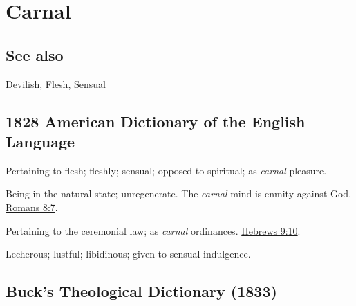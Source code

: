 \section{Carnal}
	\label{CARNAL}
	
\subsection{See also}

	\hyperref[DEVILISH]{Devilish}, \hyperref[FLESH]{Flesh}, \hyperref[SENSUAL]{Sensual}

\subsection{1828 American Dictionary of the English Language} %
	\label{CARNAL-1828}

	\begin{compactitem}
		\item[1] Pertaining to flesh; fleshly; sensual; opposed to spiritual; as \textit{carnal} pleasure.
		\item[2] Being in the natural state; unregenerate. The \textit{carnal} mind is enmity against God. \hyperref[ROMANS-8-7]{Romans 8:7}.
		\item[3] Pertaining to the ceremonial law; as \textit{carnal} ordinances. \hyperref[HEBREWS-9-10]{Hebrews 9:10}.
		\item[4] Lecherous; lustful; libidinous; given to sensual indulgence.
	\end{compactitem}


	
\subsection{Buck's Theological Dictionary (1833)} %
	\label{CARNAL-BTD}

